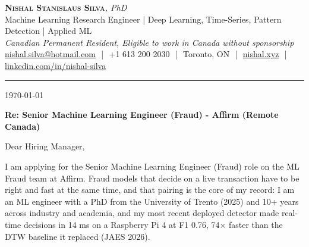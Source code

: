 \documentclass[11pt]{article}
\makeatletter
\newcommand{\clName}{Nishal Stanislaus Silva}
\newcommand{\clEmail}{nishal.silva@hotmail.com}
\newcommand{\clPhone}{+1 613 200 2030}
\newcommand{\clCity}{Toronto, ON}
\newcommand{\clSite}{https://nishal.xyz}
\newcommand{\clLinkedIn}{https://www.linkedin.com/in/nishal-silva}
\newcommand{\clStatus}{Canadian Permanent Resident, Eligible to work in Canada without sponsorship}
\newcommand{\clTagline}{Machine Learning Research Engineer | Deep Learning, Time-Series, Pattern Detection | Applied ML}
\newcommand{\clRole}{Senior Machine Learning Engineer (Fraud)}
\newcommand{\clCompany}{Affirm}
\newcommand{\clTeam}{the ML Fraud team}
\newcommand{\clAddressee}{Dear Hiring Manager,}
\makeatother
\begin{document}
\pagestyle{empty}

\begin{center}
    {\LARGE \scshape \textbf{\clName}}{\large \textit{, PhD}}
    \\[1pt]
    {\small \clTagline}
    \\[1pt]
    {\footnotesize\textit{\clStatus}}
    \\[1pt]
    {\small
    \href{mailto:\clEmail}{\clEmail}
    \,\,|\,\, \clPhone
    \,\,|\,\, \clCity
    \,\,|\,\, \href{\clSite}{nishal.xyz}
    \,\,|\,\, \href{\clLinkedIn}{linkedin.com/in/nishal-silva}}
\end{center}

\rule{\linewidth}{0.4pt}\vspace{0.6em}

\today

\textbf{Re: \clRole{} - \clCompany{} (Remote Canada)}

\clAddressee

I am applying for the \clRole{} role on \clTeam{} at \clCompany{}. Fraud models that decide on a live transaction have to be right and fast at the same time, and that pairing is the core of my record: I am an ML engineer with a PhD from the University of Trento (2025) and 10+ years across industry and academia, and my most recent deployed detector made real-time decisions in 14 ms on a Raspberry Pi 4 at F1 0.76, 74$\times$ faster than the DTW baseline it replaced (JAES 2026).
\end{document}
